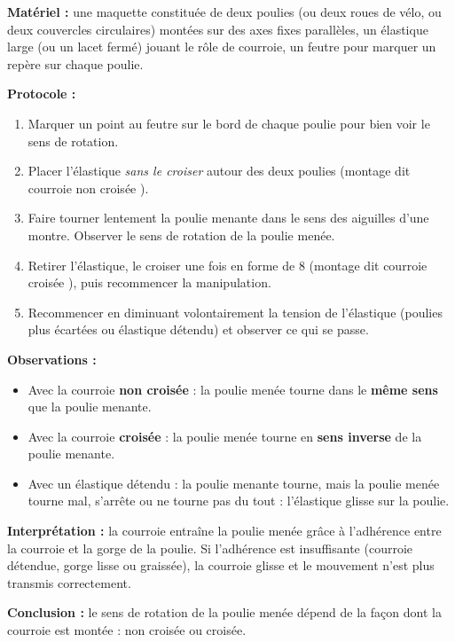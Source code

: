 \documentclass[11pt]{article}
\newcommand{\cle}[1]{{\popxbold\color{popdark}#1}}
\begin{document}
\begin{experience}
\textbf{Matériel :} une maquette constituée de deux poulies (ou deux roues de vélo, ou deux couvercles circulaires) montées sur des axes fixes parallèles, un élastique large (ou un lacet fermé) jouant le rôle de courroie, un feutre pour marquer un repère sur chaque poulie.

\textbf{Protocole :}
\begin{enumerate}
\item Marquer un point au feutre sur le bord de chaque poulie pour bien voir le sens de rotation.
\item Placer l'élastique \emph{sans le croiser} autour des deux poulies (montage dit \og courroie non croisée \fg{}).
\item Faire tourner lentement la poulie menante dans le sens des aiguilles d'une montre. Observer le sens de rotation de la poulie menée.
\item Retirer l'élastique, le croiser une fois en forme de 8 (montage dit \og courroie croisée \fg{}), puis recommencer la manipulation.
\item Recommencer en diminuant volontairement la tension de l'élastique (poulies plus écartées ou élastique détendu) et observer ce qui se passe.
\end{enumerate}

\textbf{Observations :}
\begin{itemize}
\item Avec la courroie \textbf{non croisée} : la poulie menée tourne dans le \textbf{même sens} que la poulie menante.
\item Avec la courroie \textbf{croisée} : la poulie menée tourne en \textbf{sens inverse} de la poulie menante.
\item Avec un élastique détendu : la poulie menante tourne, mais la poulie menée tourne mal, s'arrête ou ne tourne pas du tout : l'élastique \cle{glisse} sur la poulie.
\end{itemize}

\textbf{Interprétation :} la courroie entraîne la poulie menée grâce à l'\cle{adhérence} entre la courroie et la gorge de la poulie. Si l'adhérence est insuffisante (courroie détendue, gorge lisse ou graissée), la courroie glisse et le mouvement n'est plus transmis correctement.

\textbf{Conclusion :} le sens de rotation de la poulie menée dépend de la façon dont la courroie est montée : non croisée ou croisée.
\end{experience}
\end{document}
